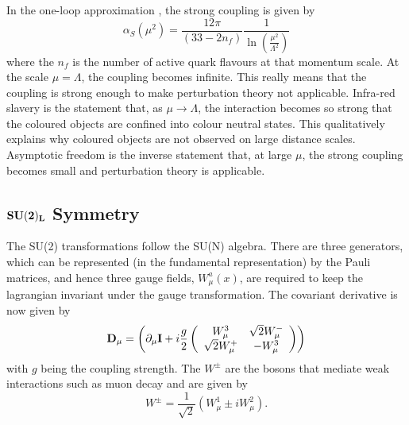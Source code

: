 In the one-loop approximation \cite{Ellis:1991qj}, the strong coupling is given by
\begin{equation} \label{alpha_la}
\alpha_S \left( \mu^2 \right) = \frac{12 \pi}{\left(33 - 2n_f \right)}\frac{1}{ \ln{\left( \frac{\mu^2}{\Lambda^2}\right)}}
\end{equation}
where the $n_f$ is the number of active quark flavours at that momentum scale. 
At the scale $\mu = \Lambda$, the coupling becomes infinite. This really means that the coupling is strong enough to make perturbation theory not applicable. 
Infra-red slavery is the statement that, as $\mu \rightarrow \Lambda$, the interaction becomes so strong that the coloured objects are confined into colour neutral states. This qualitatively explains why coloured objects are not observed on large distance scales. Asymptotic freedom is the inverse statement that, at large $\mu$, the strong coupling becomes small and perturbation theory is applicable.

\subsection{$\bold{SU(2)_L}$ Symmetry}

The SU(2) transformations follow the SU(N) algebra. There are three generators, which can be represented (in the fundamental representation) by the Pauli matrices, and hence three gauge fields, $W^a_{\mu}(x)$, are required to keep the lagrangian invariant under the gauge transformation. The covariant derivative is now given by
\begin{equation}
\bold{D_{\mu}} = \left(\partial_{\mu}\bold{I} + 
i\frac{g}{2} \left( 
\begin{array}{c c}
W^3_{\mu} & \sqrt{2}W^{-}_{\mu} \\
\sqrt{2} W^{+}_{\mu} & -W^{3}_{\mu}
\end{array}
\right) 
\right)
\end{equation}
with $g$ being the coupling strength. The $W^{\pm}$ are the bosons that mediate weak interactions such as muon decay and are given by
\begin{equation}
W^{\pm} = \frac{1}{\sqrt{2}} \left( W^{1}_{\mu} \pm iW^{2}_{\mu} \right).
\end{equation}

